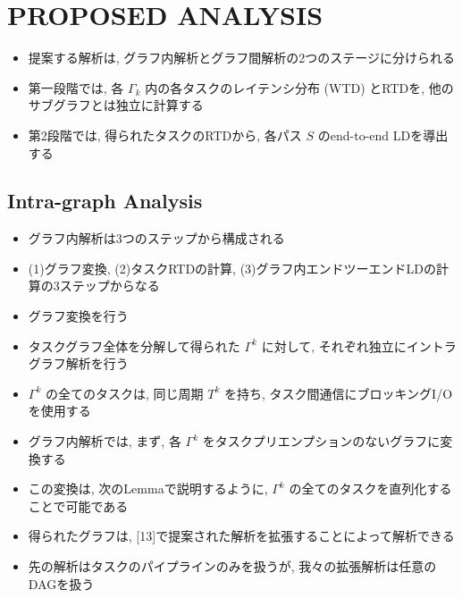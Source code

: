 
\section{PROPOSED ANALYSIS}
\label{sec: proposed analysis}

\begin{frame}{}
    \begin{itemize}
        \item 提案する解析は, グラフ内解析とグラフ間解析の2つのステージに分けられる
\item 第一段階では, 各 $\Gamma_{k}$ 内の各タスクのレイテンシ分布 (WTD) とRTDを, 他のサブグラフとは独立に計算する
\item 第2段階では, 得られたタスクのRTDから, 各パス $S$ のend-to-end LDを導出する
    \end{itemize}
\end{frame}


\subsection{Intra-graph Analysis}
\label{ssec: intra-graph analysis}

\begin{frame}{}
    \begin{itemize}
        \item グラフ内解析は3つのステップから構成される
\item (1)グラフ変換, (2)タスクRTDの計算, (3)グラフ内エンドツーエンドLDの計算の3ステップからなる
    \end{itemize}
\end{frame}

\begin{frame}{}
    \begin{itemize}
        \item グラフ変換を行う
\item タスクグラフ全体を分解して得られた $\Gamma^{k}$ に対して, それぞれ独立にイントラグラフ解析を行う
\item $\Gamma^{k}$ の全てのタスクは, 同じ周期 $T^{k}$ を持ち, タスク間通信にブロッキングI/Oを使用する
\item グラフ内解析では, まず, 各 $\Gamma^{k}$ をタスクプリエンプションのないグラフに変換する
\item この変換は, 次のLemmaで説明するように, $\Gamma^{k}$ の全てのタスクを直列化することで可能である
\item 得られたグラフは, [13]で提案された解析を拡張することによって解析できる
\item 先の解析はタスクのパイプラインのみを扱うが, 我々の拡張解析は任意のDAGを扱う
    \end{itemize}
\end{frame}

